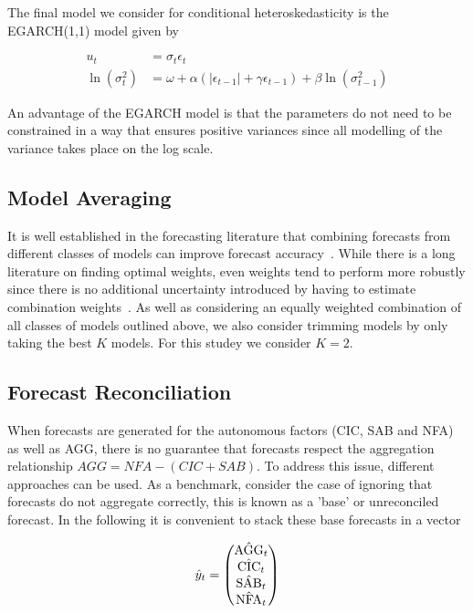 The final model we consider for conditional heteroskedasticity is the EGARCH(1,1) model \cite{Nel1991} given by

\begin{align}
  u_t&=\sigma_t\epsilon_t\\
  \ln(\sigma_t^2)&=\omega+\alpha \left(|\epsilon_{t-1}|+\gamma\epsilon_{t-1}\right)+\beta\ln(\sigma^2_{t-1})
\end{align}

An advantage of the EGARCH model is that the parameters do not need to be constrained in a way that ensures positive variances since all modelling of the variance takes place on the log scale. 

\subsection{Model Averaging}

It is well established in the forecasting literature that combining forecasts from different classes of models can improve forecast accuracy~\citep{Tim2006}. While there is a long literature on finding optimal weights, even weights tend to perform more robustly since there is no additional uncertainty introduced by having to estimate combination weights~\citep{SmiWal2009}. As well as considering an equally weighted combination of all classes of models outlined above, we also consider trimming models by only taking the best $K$ models. For this studey we consider $K=2$.%

\subsection{Forecast Reconciliation}\label{sec:forereco}

When forecasts are generated for the autonomous factors (CIC, SAB and NFA) as well as AGG, there is no guarantee that forecasts respect the aggregation relationship $AGG=NFA-(CIC+SAB)$. To address this issue, different approaches can be used. As a benchmark, consider the case of ignoring that forecasts do not aggregate correctly, this is known as a 'base' or unreconciled forecast. In the following it is convenient to stack these base forecasts in a vector

\[
\hat{\boldmath{y}}_t=\begin{pmatrix}\hat{\textrm{AGG}}_t\\
\hat{\textrm{CIC}}_t\\
\hat{\textrm{SAB}}_t\\
\hat{\textrm{NFA}}_t\end{pmatrix}
\]

